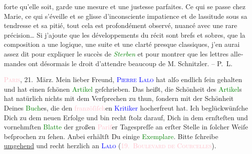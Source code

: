 {{\begin{otherlanguage}{french}
                     forte qu’elle soit, garde une mesure et une justesse parfaites. Ce qui se passe
                     chez Marie, ce qui s’éveille et se glisse d’inconsciente impatience et de
                     lassitude sous sa tendresse et sa pitié, tout cela est profondément observé,
                     nuancé avec une rare précision{\dots} Si j’ajoute que les
                     développements du récit sont brefs et sobres, que la composition a une logique,
                     une suite et une clarté presque classiques, j’en aurai assez dit pour expliquer
                     le succès de \textcolor{green}{\emph{Sterben}}{}\ledrightnote{\textcolor{green}{Sterben. Novelle}} et pour montrer que les lettres allemandes ont désormais le droit
                     d’attendre beaucoup de M. Schnitzler. – P. L.\end{otherlanguage}}}\pend
           \pstart
           \raggedleft{}{\pb}\textsc{\textcolor{pink}{Paris}{}\ledrightnote{\textcolor{pink}{Paris}}}, 21. März.\pend
           \pstart\center{}Mein lieber Freund,\pend\pstart
           \textsc{\textcolor{blue}{Pierre Lalo}{}\ledrightnote{\textcolor{blue}{Pierre Lalo}}} hat alſo endlich ſein \label{K_L02731-1v}\label{K_L02731-1h} gehalten und hat einen ſchönen \textcolor{green}{Artikel}{} geſchrieben. Das heißt, die Schönheit des \textcolor{green}{Artikel}{}s hat natürlich nichts
               mit dem Verſprechen zu thun, ſondern mit der Schönheit Deines \textcolor{green}{Buch}{}es, die den \textcolor{pink}{franzöſiſch}{}en \textcolor{blue}{Kritiker}{} hocherfreut hat. Ich beglückwünſche
               Dich zu dem neuen Erfolge und bin recht ſtolz darauf, Dich in dem ernſteſten und
               vornehmſten \textcolor{green}{Blatte}{} der großen
                  \textcolor{pink}{Pariſ}{}\ledrightnote{\textcolor{pink}{Paris}}er Tagespreſſe an erſter Stelle in
               ſolcher Weiſe beſprochen zu ſehen.\pend
           \pstart
           {\pb}Anbei erhältſt Du einige \textcolor{green}{Exemplare}{}. Bitte ſchreibe \uline{umgehend} und recht herzlich an \textsc{\textcolor{blue}{Lalo}{}\ledrightnote{\textcolor{blue}{Pierre Lalo}}} (\textcolor{pink}{\textsc{19. Boulevard de Courcelles}}{}\ledrightnote{\textcolor{pink}{Boulevard de Courcelles}}). \pend
